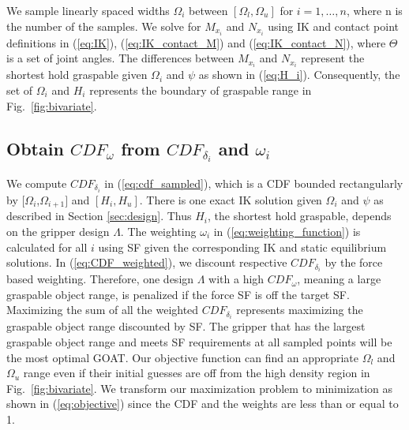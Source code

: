 \documentclass[letterpaper, 10 pt, conference]{ieeeconf}  %
\newcommand{\fig}[1]{Fig.~\ref{#1}}
\newcommand{\eq}[1]{(\ref{#1})}
\begin{document}
We sample linearly spaced widths $\Omega_i$ between $[\Omega_{l},\Omega_{u}]$ for $i=1,\dots,n$, where n is the number of the samples. We solve for $M_{x_i}$ and $N_{x_i}$ using IK and contact point definitions in \eq{eq:IK}, \eq{eq:IK_contact_M} and \eq{eq:IK_contact_N}, where $\Theta$ is a set of joint angles. The differences between $M_{x_i}$ and $N_{x_i}$ represent the shortest hold graspable given $\Omega_i$ and $\psi$ as shown in \eq{eq:H_i}. Consequently, the set of $\Omega_i$ and $H_i$ represents the boundary of graspable range in \fig{fig:bivariate}. 



\subsection{Obtain $CDF_\omega$ from $CDF_{\delta_i}$ and $\omega_i$}
We compute $CDF_{\delta_i}$ in \eq{eq:cdf_sampled}, which is a CDF bounded rectangularly by [$\Omega_i$,$\Omega_{i+1}]$ and $[H_i,H_u]$. 
There is one exact IK solution given $\Omega_i$ and $\psi$ as described in Section \ref{sec:design}. Thus $H_i$, the shortest hold graspable, depends on the gripper design $\Lambda$.
The weighting $\omega_i$ in \eq{eq:weighting_function} is calculated for all $i$ using SF given the corresponding IK and static equilibrium solutions. In \eq{eq:CDF_weighted}, we discount respective $CDF_{\delta_i}$ by the force based weighting. Therefore, one design $\Lambda$ with a high $CDF_\omega$, meaning a large graspable object range, is penalized if the force SF is off the target SF. Maximizing the sum of all the weighted $CDF_{\delta_i}$ represents maximizing the graspable object range discounted by SF. The gripper that has the largest graspable object range and meets SF requirements at all sampled points will be the most optimal GOAT. Our objective function can find an appropriate $\Omega_l$ and $\Omega_u$ range even if their initial guesses are off from the high density region in \fig{fig:bivariate}.
We transform our maximization problem to minimization as shown in \eq{eq:objective} since the CDF and the weights are less than or equal to 1. 
\end{document}

